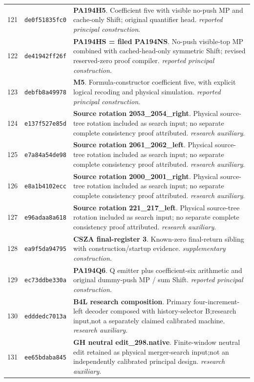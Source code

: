 \begin{longtable}{@{}r p{} p{}@{}}
121 & \texttt{de0f51835fc0} & \textbf{PA194H5}. Coefficient five with visible no-push MP and cache-only Shift; original quantifier head. \emph{reported principal construction}.\\[3pt]
122 & \texttt{de41942ff26f} & \textbf{PA194HS = filed PA194NS}. No-push visible-top MP combined with cached-head-only symmetric Shift; revised reserved-zero proof compiler. \emph{reported principal construction}.\\[3pt]
123 & \texttt{debfb8a49978} & \textbf{M5}. Formula-constructor coefficient five, with explicit logical recoding and physical simulation. \emph{reported principal construction}.\\[3pt]
124 & \texttt{e137f527e85d} & \textbf{Source rotation 2053\_2054\_right}. Physical source-tree rotation included as search input; no separate complete consistency proof attributed. \emph{research auxiliary}.\\[3pt]
125 & \texttt{e7a84a54de98} & \textbf{Source rotation 2061\_2062\_left}. Physical source-tree rotation included as search input; no separate complete consistency proof attributed. \emph{research auxiliary}.\\[3pt]
126 & \texttt{e8a1b4102ecc} & \textbf{Source rotation 2000\_2001\_right}. Physical source-tree rotation included as search input; no separate complete consistency proof attributed. \emph{research auxiliary}.\\[3pt]
127 & \texttt{e96adaa8a618} & \textbf{Source rotation 221\_217\_left}. Physical source-tree rotation included as search input; no separate complete consistency proof attributed. \emph{research auxiliary}.\\[3pt]
128 & \texttt{ea9f5da94795} & \textbf{CSZA final-register 3}. Known-zero final-return sibling with construction/startup evidence. \emph{supplementary construction}.\\[3pt]
129 & \texttt{ec73ddbe330a} & \textbf{PA194Q6}. Q emitter plus coefficient-six arithmetic and original dummy-push MP / sum Shift. \emph{reported principal construction}.\\[3pt]
130 & \texttt{edddedc7013a} & \textbf{B4L research composition}. Primary four-increment-left decoder composed with history-selector B;research input,not a separately claimed calibrated machine. \emph{research auxiliary}.\\[3pt]
131 & \texttt{ee65bdaba845} & \textbf{GH neutral edit\_298.native}. Finite-window neutral edit retained as physical merger-search input;not an independently calibrated principal design. \emph{research auxiliary}.\\[3pt]

\end{longtable}
